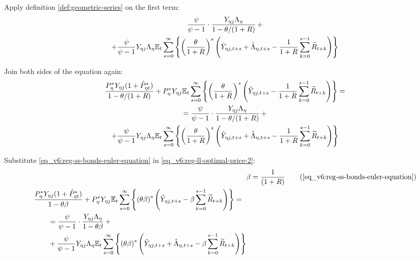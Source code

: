 \documentclass[../thesis.tex]{subfiles}
\begin{document}
Apply definition \ref{def:geometric-series} on the first term:
\begin{multline}
	\frac{\psi}{\psi-1} \cdot \frac{Y_{\eta j} \Lambda_{\eta}}{1-\theta /(1+R)} \, + 
	\\
	+ \frac{\psi}{\psi-1} Y_{\eta j} \Lambda_{\eta} {\mathbb{E}_{t}} \sum_{s=0}^{\infty} \left\{ \left( \frac{\theta}{1 + R} \right)^s \left( \hat{Y}_{\eta j, t+s} + \hat{\Lambda}_{\eta, t+s} - \frac{1}{1 + R} \sum_{k=0}^{s-1} \widetilde{R}_{t+k} \right) \right\} \nonumber
\end{multline}

Join both sides of the equation again:
\begin{multline}
	\frac{ P_{\eta}^{\ast} Y_{\eta j} ( 1 + \hat{P}_{\eta t}^{\ast} )}{1-\theta /(1+R)} + P_{\eta}^{\ast} Y_{\eta j} {\mathbb{E}_{t}} \sum_{s=0}^{\infty} \left\{ \left( \frac{\theta}{1 + R} \right)^s \left( \hat{Y}_{\eta j, t+s} - \frac{1}{1 + R} \sum_{k=0}^{s-1} \widetilde{R}_{t+k} \right) \right\} = 
	\\
	= \frac{\psi}{\psi-1} \cdot \frac{Y_{\eta j} \Lambda_{\eta}}{1-\theta /(1+R)} \, + 
	\\
	+ \frac{\psi}{\psi-1} Y_{\eta j} \Lambda_{\eta} {\mathbb{E}_{t}} \sum_{s=0}^{\infty} \left\{ \left( \frac{\theta}{1 + R} \right)^s \left( \hat{Y}_{\eta j, t+s} + \hat{\Lambda}_{\eta, t+s} - \frac{1}{1 + R} \sum_{k=0}^{s-1} \widetilde{R}_{t+k} \right) \right\} \label{eq_v6:reg-ll-optimal-price-2}
\end{multline}

Substitute \ref{eq_v6:reg-ss-bonds-euler-equation} in \ref{eq_v6:reg-ll-optimal-price-2}:
\begin{align}
	& \beta = \frac{1}{(1 + R)} \tag{\ref{eq_v6:reg-ss-bonds-euler-equation}} \\
	\begin{split} & \frac{ P_{\eta}^{\ast} Y_{\eta j} ( 1 + \hat{P}_{\eta t}^{\ast} )}{1- \theta \beta} + P_{\eta}^{\ast} Y_{\eta j} \E \sum_{s=0}^{\infty} \left\{ \left( \theta \beta \right)^s \left( \hat{Y}_{\eta j, t+s} - \beta \sum_{k=0}^{s-1} \widetilde{R}_{t+k} \right) \right\} = \\ & \qquad = \frac{\psi}{\psi-1} \cdot \frac{Y_{\eta j} \Lambda_{\eta}}{1- \theta \beta} \, + \\ & \qquad + \frac{\psi}{\psi-1} Y_{\eta j} \Lambda_{\eta} \E \sum_{s=0}^{\infty} \left\{ \left( \theta \beta \right)^s \left( \hat{Y}_{\eta j, t+s} + \hat{\Lambda}_{\eta, t+s} - \beta \sum_{k=0}^{s-1} \widetilde{R}_{t+k} \right) \right\} \end{split} \label{eq_v6:reg-ll-optimal-price-3}
\end{align}
\end{document}
